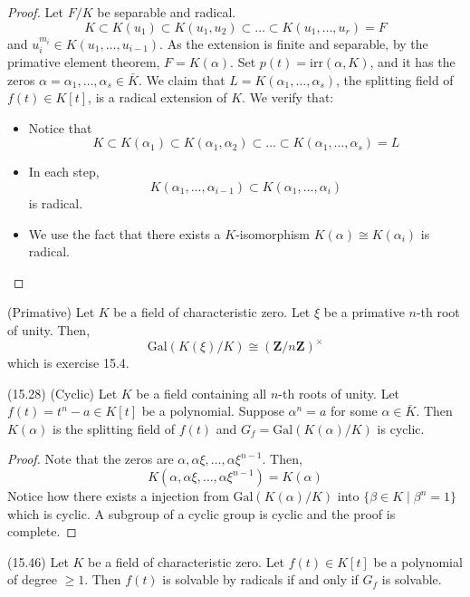 \vspace{2ex}
\begin{proof}
Let $F/K$ be separable and radical. 
\[K\subset K(u_1)\subset K(u_1,u_2)\subset \ldots \subset K(u_1,\ldots ,u_{r})=F\]
and $u_{i}^{m_{i}}\in K(u_{1},\ldots ,u_{i-1})$. As the extension is finite and separable, by the primative element theorem, $F=K(\alpha )$. Set $p(t)=\mathrm{irr}(\alpha ,K)$, and it has the zeros $\alpha =\alpha_1,\ldots ,\alpha _{s}\in \bar{K}$. We claim that $L=K(\alpha_1,\ldots ,\alpha_{s} )$, the splitting field of $f(t)\in K[t]$, is a radical extension of $K$. We verify that:
\begin{itemize}
\item[(i)] Notice that
\[K\subset K(\alpha_1)\subset K(\alpha_1,\alpha_2)\subset \ldots \subset K(\alpha_1,\ldots ,\alpha _{s})=L\]
\item[(ii)] In each step, 
\[K(\alpha_1,\ldots ,\alpha _{i-1})\subset K(\alpha_1,\ldots ,\alpha _{i})\]
is radical.
\item[(iii)] We use the fact that there exists a $K$-isomorphism $K(\alpha )\cong K(\alpha_{i})$ is radical.
\end{itemize}
\end{proof}
\vspace{2ex}
\begin{lem}
(Primative) Let $K$ be a field of characteristic zero. Let $\xi $ be a primative $n$-th root of unity. Then,
\[\mathrm{Gal}(K(\xi )/K)\cong ({\bm Z}/n{\bm Z})^{\times }\]
which is exercise 15.4.
\end{lem}
\vspace{2ex}
\begin{lem}
(15.28) (Cyclic) Let $K$ be a field containing all $n$-th roots of unity. Let $f(t)=t^{n}-a\in K[t]$ be a polynomial. Suppose $\alpha^{n}=a$ for some $\alpha \in \bar{K}$. Then $K(\alpha )$ is the splitting field of $f(t)$ and $G_{f}=\mathrm{Gal}(K(\alpha )/K)$ is cyclic.
\end{lem}
\vspace{2ex}
\begin{proof}
Note that the zeros are $\alpha ,\alpha \xi ,\ldots ,\alpha \xi ^{n-1}$. Then,
\[K(\alpha ,\alpha \xi ,\ldots ,\alpha \xi ^{n-1})=K(\alpha )\]
Notice how there exists a injection from $\mathrm{Gal}(K(\alpha)/K)$ into $\{\beta \in K\;|\;\beta ^{n}=1\}$ which is cyclic. A subgroup of a cyclic group is cyclic and the proof is complete.
\end{proof}
\vspace{2ex}
\begin{thm}
(15.46) Let $K$ be a field of characteristic zero. Let $f(t)\in K[t]$ be a polynomial of degree $\geq 1$. Then $f(t)$ is solvable by radicals if and only if $G_{f}$ is solvable. 
\end{thm}
